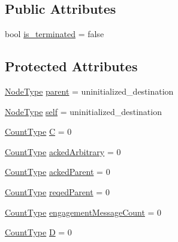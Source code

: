 \subsection*{Public Attributes}
\begin{DoxyCompactItemize}
\item 
bool \hyperlink{structvt_1_1term_1_1ds_1_1_term_d_s_af53bdb81804df4d07dc7fd647329a89a}{is\+\_\+terminated} = false
\end{DoxyCompactItemize}
\subsection*{Protected Attributes}
\begin{DoxyCompactItemize}
\item 
\hyperlink{namespacevt_a866da9d0efc19c0a1ce79e9e492f47e2}{Node\+Type} \hyperlink{structvt_1_1term_1_1ds_1_1_term_d_s_a904c12ccc672c4849af1cc6e89a91c54}{parent} = uninitialized\+\_\+destination
\item 
\hyperlink{namespacevt_a866da9d0efc19c0a1ce79e9e492f47e2}{Node\+Type} \hyperlink{structvt_1_1term_1_1ds_1_1_term_d_s_adadcd6e130836bc8d8a6819797f6900b}{self} = uninitialized\+\_\+destination
\item 
\hyperlink{structvt_1_1term_1_1ds_1_1_term_d_s_a54f4ebd7e1ecb59c32c0f5b03ef9f20b}{Count\+Type} \hyperlink{structvt_1_1term_1_1ds_1_1_term_d_s_a5d909caa14a0da42d9809d83e0f79f40}{C} = 0
\item 
\hyperlink{structvt_1_1term_1_1ds_1_1_term_d_s_a54f4ebd7e1ecb59c32c0f5b03ef9f20b}{Count\+Type} \hyperlink{structvt_1_1term_1_1ds_1_1_term_d_s_a3d2853955fae8dbf0180704c67e6eec2}{acked\+Arbitrary} = 0
\item 
\hyperlink{structvt_1_1term_1_1ds_1_1_term_d_s_a54f4ebd7e1ecb59c32c0f5b03ef9f20b}{Count\+Type} \hyperlink{structvt_1_1term_1_1ds_1_1_term_d_s_a694ea9720fa7137d823a58b55250119f}{acked\+Parent} = 0
\item 
\hyperlink{structvt_1_1term_1_1ds_1_1_term_d_s_a54f4ebd7e1ecb59c32c0f5b03ef9f20b}{Count\+Type} \hyperlink{structvt_1_1term_1_1ds_1_1_term_d_s_af2aced5d22eef80e3e4d1cf761f52693}{reqed\+Parent} = 0
\item 
\hyperlink{structvt_1_1term_1_1ds_1_1_term_d_s_a54f4ebd7e1ecb59c32c0f5b03ef9f20b}{Count\+Type} \hyperlink{structvt_1_1term_1_1ds_1_1_term_d_s_ad8d11aea5b48de393ba6f94c0ce8ed7e}{engagement\+Message\+Count} = 0
\item 
\hyperlink{structvt_1_1term_1_1ds_1_1_term_d_s_a54f4ebd7e1ecb59c32c0f5b03ef9f20b}{Count\+Type} \hyperlink{structvt_1_1term_1_1ds_1_1_term_d_s_afcfe54a5e5844f7483cd730c9970fe36}{D} = 0

\end{DoxyCompactItemize}
